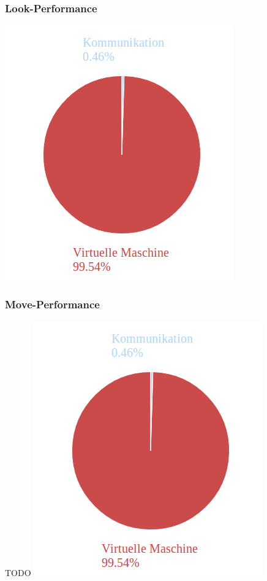 \begin{frame}
\frametitle{Look-Performance}
\begin{center}
	\includegraphics[scale=0.3]{performance/look-100.png}
\end{center}

\end{frame}

\begin{frame}
\frametitle{Move-Performance}
\begin{center}
TODO
	\includegraphics[scale=0.3]{performance/look-100.png}
\end{center}

\end{frame}
